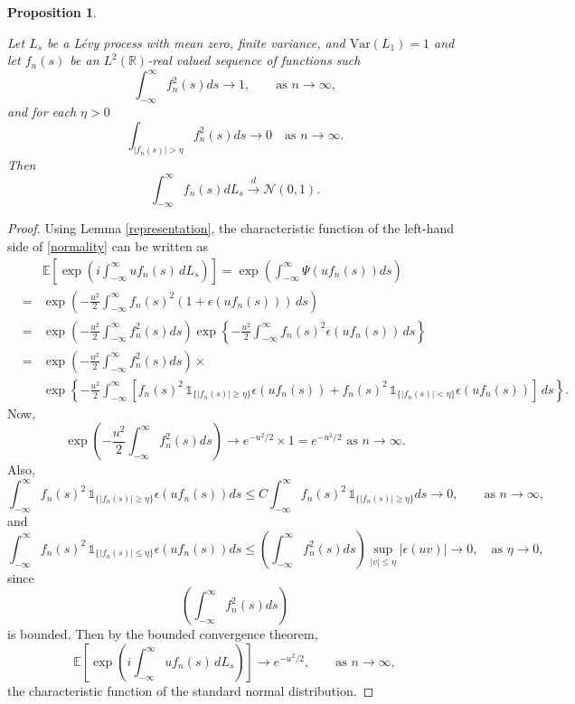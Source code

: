 \documentclass[10pt,a4paper]{amsart}
\newtheorem{prop}{Proposition}
\newcommand{\ind}[1]{\,\mathds{1}_{\{#1\}}}
\begin{document}
\begin{prop}\label{lindeberg1}

Let $L_s$ be a L\'evy process with mean zero, finite variance, and $\textrm{Var}(L_1)=1$ and let $f_n(s)$ be an $L^2(\mathbb{R})$-real valued  sequence of functions such
$$
\int_{-\infty}^\infty f_n^2(s)ds\to1,\qquad\textrm{as }n\to\infty,
$$
and  for each $\eta>0$
$$
\int_{\vert f_n(s)\vert>\eta}f_n^2(s)ds\to0\quad\textrm{as }n\to\infty.
$$
Then
\begin{equation}\label{normality}
\int_{-\infty}^\infty f_n(s)dL_s\overset{d}{\longrightarrow}\mathcal{N}(0,1).
\end{equation}
\end{prop}

\begin{proof}
    
Using Lemma \ref{representation},  the characteristic function of the left-hand side of \eqref{normality} can be written as
\begin{eqnarray}\label{conditional expectation}
&&\mathbb{E}\left[\exp\left(i\int_{-\infty}^\infty uf_n(s)\,dL_s\right)\right]
=\exp\left(\int_{-\infty}^\infty \Psi(uf_n(s))ds\right)\nonumber\\
&=&\exp\left(
-\frac{u^2}{2}
\int_{-\infty}^{\infty}
f_n(s)^2
\left(1+\epsilon(uf_n(s))\right)\,ds
\right)\nonumber\\
&=&
\exp\left(-\frac{u^2}{2}\int_{-\infty}^\infty f^2_n(s)ds\right)
\exp
\left\{
-\frac{u^2}{2}
\int_{-\infty}^{\infty}
f_n(s)^2\epsilon(uf_n(s))\,ds
\right\}
\nonumber\\
&=&\exp\left(-\frac{u^2}{2}\int_{-\infty}^\infty f^2_n(s)ds\right)\times\nonumber\\
&&
\exp
\left\{
-\frac{u^2}{2}
\int_{-\infty}^{\infty}
\left[f_n(s)^2\ind{\vert f_n(s)\vert\ge\eta}\epsilon(uf_n(s))+
f_n(s)^2\ind{\vert f_n(s)\vert<\eta}\epsilon(uf_n(s))\right]\,ds
\right\}\nonumber.
\end{eqnarray}
Now,
$$
\exp\left(-\frac{u^2}{2}\int_{-\infty}^\infty f^2_n(s)ds\right)\to e^{-u^2/2}\times1=e^{-u^2/2}\textrm{ as }n\to\infty.
$$
Also,
$$
\int_{-\infty}^{\infty}
f_n(s)^2\ind{\vert f_n(s)\vert\ge\eta}\epsilon(uf_n(s))ds\le C
\int_{-\infty}^{\infty}
f_n(s)^2\ind{\vert f_n(s)\vert\ge\eta}ds\to0,\qquad\textrm{as }n\to\infty,
$$
and
$$
\int_{-\infty}^{\infty}
f_n(s)^2\ind{\vert f_n(s)\vert\le\eta}\epsilon(uf_n(s))ds\le \left(\int_{-\infty}^\infty f^2_n(s)ds\right)
\underset{\vert v\vert\le\eta}{\sup}\vert\epsilon(uv)\vert\to0,\quad\textrm{as }\eta\to0,
$$
since 
$$
 \left(\int_{-\infty}^\infty f^2_n(s)ds\right)
$$
is bounded.
Then by the bounded convergence theorem, 
$$
\mathbb{E}\left[\exp\left(i\int_{-\infty}^\infty uf_n(s)\,dL_s\right)\right]\to e^{-u^2/2},\qquad\textrm{as }n\to\infty,
$$
the characteristic function of the standard normal distribution.

\end{proof}
\end{document}
